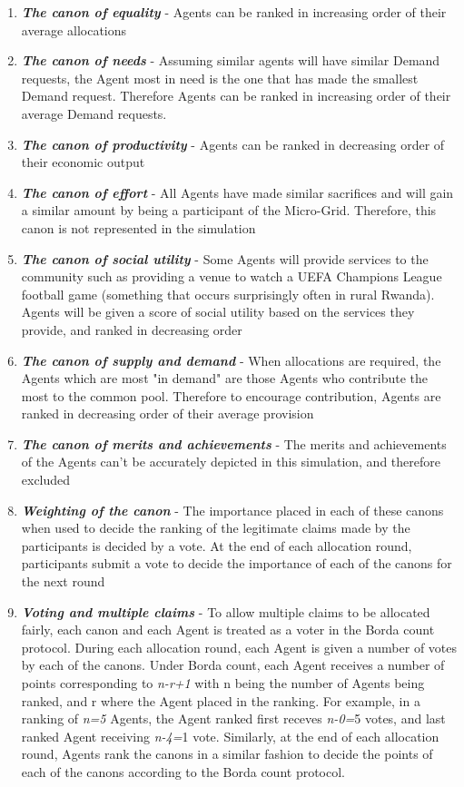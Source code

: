\begin{enumerate}
	\item \textbf{\textit{The canon of equality}} - Agents can be ranked in increasing order of their average allocations
	\item \textbf{\textit{The canon of needs}} - Assuming similar agents will have similar Demand requests, the Agent most in need is the one that has made the smallest Demand request. Therefore Agents can be ranked in increasing order of their average Demand requests.
	\item \textbf{\textit{The canon of productivity}} - Agents can be ranked in decreasing order of their economic output
	\item \textbf{\textit{The canon of effort}} - All Agents have made similar sacrifices and will gain a similar amount by being a participant of the Micro-Grid. Therefore, this canon is not represented in the simulation
	\item \textbf{\textit{The canon of social utility}} - Some Agents will provide services to the community such as providing a venue to watch a UEFA Champions League football game (something that occurs surprisingly often in rural Rwanda). Agents will be given a score of social utility based on the services they provide, and ranked in decreasing order
	\item \textbf{\textit{The canon of supply and demand}} - When allocations are required, the Agents which are most "in demand" are those Agents who contribute the most to the common pool. Therefore to encourage contribution, Agents are ranked in decreasing order of their average provision
	\item \textbf{\textit{The canon of merits and achievements}} - The merits and achievements of the Agents can't be accurately depicted in this simulation, and therefore excluded
	\item \textbf{\textit{Weighting of the canon}} - The importance placed in each of these canons when used to decide the ranking of the legitimate claims made by the participants is decided by a vote. At the end of each allocation round, participants submit a vote to decide the importance of each of the canons for the next round
	\item \textbf{\textit{Voting and multiple claims}} - To allow multiple claims to be allocated fairly, each canon and each Agent is treated as a voter in the Borda count protocol. During each allocation round, each Agent is given a number of votes by each of the canons. Under Borda count, each Agent receives a number of points corresponding to \textit{n-r+1} with n being the number of Agents being ranked, and r where the Agent placed in the ranking. For example, in a ranking of \textit{n=5} Agents, the Agent ranked first receves \textit{n-0=}5 votes, and last ranked Agent receiving \textit{n-4=}1 vote. Similarly, at the end of each allocation round, Agents rank the canons in a similar fashion to decide the points of each of the canons according to the Borda count protocol.
\end{enumerate}

